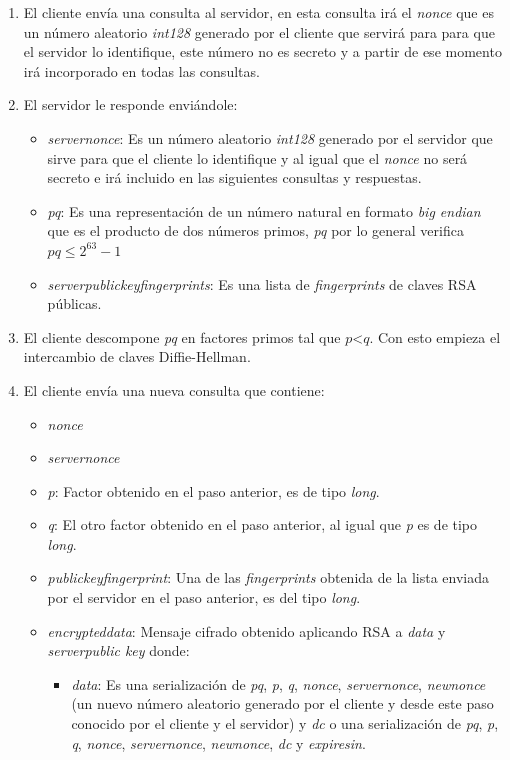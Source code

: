 \begin{enumerate}
	\item El cliente envía una consulta al servidor, en esta consulta irá el \emph{nonce} que es un número aleatorio \emph{int128} generado por el cliente que servirá para para que el servidor lo identifique, este número no es secreto y a partir de ese momento irá incorporado en todas las consultas. 
	
	\item El servidor le responde enviándole: 
	\begin{itemize}
		\item \emph{server\textunderscore nonce}: Es un número aleatorio \emph{int128} generado por el servidor que sirve para que el cliente lo identifique y al igual que el \emph{nonce} no será secreto e irá incluido en las siguientes consultas y respuestas. 
		\item \emph{pq}: Es una representación de un número natural en formato \emph{big endian} que es el producto de dos números primos, \emph{pq} por lo general verifica $pq \leq 2^{63}-1$
		\item \emph{server\textunderscore public\textunderscore key\textunderscore fingerprints}: Es una lista de \emph{fingerprints} de claves RSA públicas.
	\end{itemize}

	\item El cliente descompone \emph{pq} en factores primos tal que $p$\textless$q$. Con esto empieza el intercambio de claves Diffie-Hellman.

	\item El cliente envía una nueva consulta que contiene:
	\begin{itemize}
		\item \emph{nonce}
		\item \emph{server\textunderscore nonce}
		\item \emph{p}: Factor obtenido en el paso anterior, es de tipo \emph{long}.
		\item \emph{q}: El otro factor obtenido en el paso anterior, al igual que \emph{p} es de tipo \emph{long}.
		\item \emph{public\textunderscore key\textunderscore fingerprint}: Una de las \emph{fingerprints} obtenida de la lista enviada por el servidor en el paso anterior, es del tipo \emph{long}.
		\item \emph{encrypted\textunderscore data}: Mensaje cifrado obtenido aplicando RSA a \emph{data} y \emph{server\textunderscore public \textunderscore key} donde:
		\begin{itemize}
			\item \emph{data}: Es una serialización de \emph{pq}, \emph{p}, \emph{q}, \emph{nonce}, \emph{server\textunderscore nonce}, \emph{new\textunderscore nonce} (un nuevo número aleatorio generado por el cliente y desde este paso conocido por el cliente y el servidor) y \emph{dc} o una serialización de \emph{pq}, \emph{p}, \emph{q}, \emph{nonce}, \emph{server\textunderscore nonce}, \emph{new\textunderscore nonce}, \emph{dc} y \emph{expires\textunderscore in}.


\end{itemize}
\end{itemize}
\end{enumerate}
